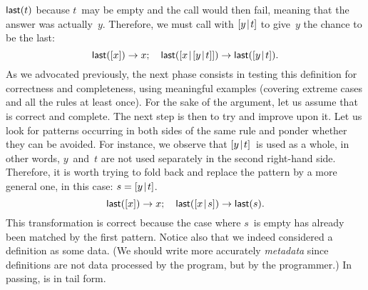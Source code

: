 \(\textsf{last}(t)\) because \(t\)~may be empty and the call would then
fail, meaning that the answer was actually~\(y\). Therefore, we must
call with \([{y}\!\mid\!{t}]\) to give~\(y\) the chance to be the last:
\begin{equation*}
\textsf{last}([x]) \rightarrow x;\quad
\textsf{last}([{x}\!\mid\!{[{y}\!\mid\!{t}]}]) \rightarrow \textsf{last}([{y}\!\mid\!{t}]).
\end{equation*}
As we advocated previously, the next phase consists in testing this
definition for correctness and completeness, using meaningful examples
(covering extreme cases and all the rules at least once). For the sake
of the argument, let us assume that  is correct and
complete. The next step is then to try and improve upon it. Let us
look for patterns occurring in both sides of the same rule and ponder
whether they can be avoided. For instance, we observe that
\([{y}\!\mid\!{t}]\)~is used as a whole, in other words, \(y\)~and~\(t\)
are not used separately in the second right\hyp{}hand side. Therefore,
it is worth trying to fold back and replace the pattern by a more
general one, in this case: \(s = [{y}\!\mid\!{t}]\).
\begin{equation*}
\textsf{last}([x]) \rightarrow x;\quad
\textsf{last}([{x}\!\mid\!{s}]) \rightarrow \textsf{last}(s).
\end{equation*}
This transformation is correct because the case where \(s\)~is empty
has already been matched by the first pattern. Notice also that we
indeed considered a definition as some data. (We should write more
accurately \emph{metadata} since definitions are not data processed by
the program, but by the programmer.) In passing,  is in
tail form.


